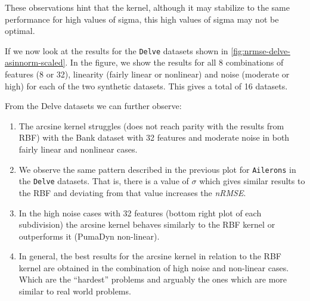 These observations hint that the kernel, although it may stabilize to the same
performance for high values of sigma, this high values of sigma may not be
optimal.

If we now look at the results for the \texttt{Delve} datasets shown in
\cref{fig:nrmse-delve-asinnorm-scaled}. In the figure, we show the results for
all 8 combinations of features (8 or 32), linearity (fairly linear or nonlinear)
and noise (moderate or high) for each of the two synthetic datasets. This
gives a total of 16 datasets.

From the Delve datasets we can further observe:
\begin{enumerate}
    \item The arcsine kernel struggles (does not reach parity with the results from RBF)
          with the Bank dataset with 32 features and moderate noise in
          both fairly linear and nonlinear cases.
    \item We observe the same pattern described in the previous plot for
          \texttt{Ailerons} in the \texttt{Delve} datasets. That is,
          there is a value of $\sigma$ which gives similar results to the RBF and
          deviating from that value increases the \emph{nRMSE}.
    \item In the high noise cases with 32 features (bottom right plot
          of each subdivision) the arcsine kernel behaves similarly to the RBF kernel
          or outperforms it (PumaDyn non-linear).
    \item In general, the best results for the arcsine kernel in relation to the
          RBF kernel are obtained in the combination of high noise and non-linear
          cases. Which are the ``hardest'' problems and arguably the ones which
          are more similar to real world problems.
\end{enumerate}



